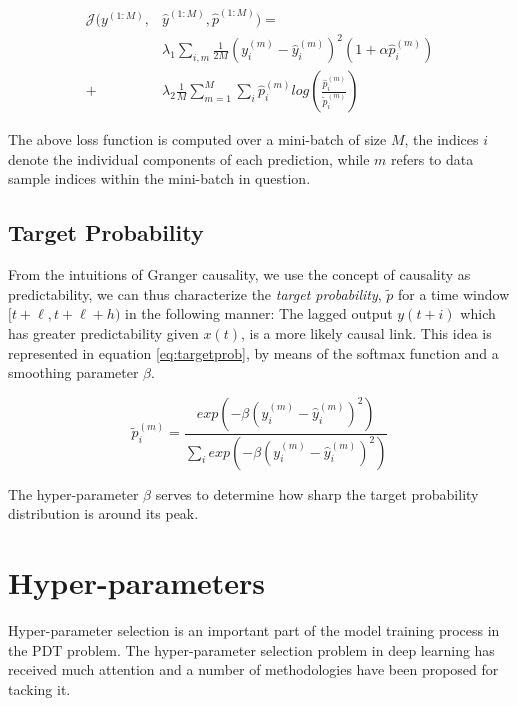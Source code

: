 \documentclass[envcountsect,runningheads]{llncs}
\theoremstyle{etoile}
\begin{document}
\begin{equation}\label{eq:loss}
\begin{aligned}
\mathcal{J}(y^{(1:M)}, &\hat{y}^{(1:M)}, \hat{p}^{(1:M)}) =\\ 
&\lambda_1 \sum_{i,m}{\frac{1}{2M} (y^{(m)}_{i} - \hat{y}^{(m)}_{i})^2 (1 + \alpha \hat{p}^{(m)}_i)} \\ 
+ &\lambda_2 \frac{1}{M} \sum_{m = 1}^{M}{\sum_{i}{\hat{p}^{(m)}_{i}log \left (\frac{\hat{p}^{(m)}_i}{\tilde{p}^{(m)}_i} \right)}}
\end{aligned}
\end{equation}
      

The above loss function is computed over a mini-batch of size $M$, the indices $i$ denote the
individual components of each prediction, while $m$ refers to data sample indices within the
mini-batch in question.


\subsection{Target Probability}\label{sec:targetprob}

From the intuitions of Granger causality, we use the concept of causality as predictability, 
we can thus characterize the \emph{target probability}, $\widetilde{p}$ for a time window 
$[t+\ell, t+\ell+h)$ in the following manner: The lagged output $y(t+i)$ which has greater 
predictability given $x(t)$, is a more likely causal link. This idea is represented in 
equation \ref{eq:targetprob}, by means of the softmax function and a smoothing parameter 
$\beta$.

\begin{equation}\label{eq:targetprob}
\widetilde{p}_{i}^{(m)} = \frac{exp \left(- \beta (y_{i}^{(m)} - \hat{y}_{i}^{(m)})^{2} \right)}
{\sum_{i}{exp \left(- \beta (y_{i}^{(m)} - \hat{y}_{i}^{(m)})^{2} \right)}} 
\end{equation}

The hyper-parameter $\beta$ serves to determine how sharp the target probability distribution is 
around its peak.


\section{Hyper-parameters}

Hyper-parameter selection is an important part of the model training process in the PDT problem. 
The hyper-parameter selection problem in deep learning has received much attention and a number 
of methodologies have been proposed for tacking it. 
\end{document}
